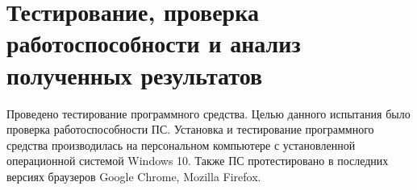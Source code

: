 \newcommand{\connectButton}{<<Connect to IP camera>>}
\newcommand{\ipInput}{<<IP address>>}
\newcommand{\nameInput}{<<Camera name>>}
\newcommand{\addCameraPage}{<<Add new camera>>}
\newcommand{\imrPage}{<<Image>>}
\newcommand{\submitButton}{<<Submit>>}
\newcommand{\selectButton}{<<Select Image>>}
\newcommand{\pluginFolder}{<<plugins>>}



\section{Тестирование, проверка работоспособности и анализ полученных результатов} %
\label{sec:testing}

Проведено тестирование программного средства. Целью данного испытания было проверка работоспособности ПС. 
Установка и тестирование программного средства производилась на персональном компьютере с установленной операционной системой Windows 10. Также ПС протестировано в последних версиях браузеров Google Chrome, Mozilla Firefox.

